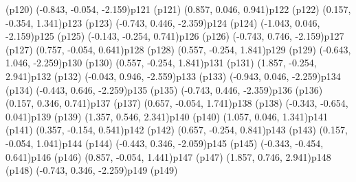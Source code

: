 \psdot[fillcolor=white](p120)
\psPoint(-0.843, -0.054, -2.159){p121}
\psdot[fillcolor=gray](p121)
\psPoint(0.857, 0.046, 0.941){p122}
\psdot[fillcolor=gray](p122)
\psPoint(0.157, -0.354, 1.341){p123}
\psdot[fillcolor=white](p123)
\psPoint(-0.743, 0.446, -2.359){p124}
\psdot[fillcolor=gray](p124)
\psPoint(-1.043, 0.046, -2.159){p125}
\psdot[fillcolor=gray](p125)
\psPoint(-0.143, -0.254, 0.741){p126}
\psdot[fillcolor=white](p126)
\psPoint(-0.743, 0.746, -2.159){p127}
\psdot[fillcolor=white](p127)
\psPoint(0.757, -0.054, 0.641){p128}
\psdot[fillcolor=gray](p128)
\psPoint(0.557, -0.254, 1.841){p129}
\psdot[fillcolor=white](p129)
\psPoint(-0.643, 1.046, -2.259){p130}
\psdot[fillcolor=white](p130)
\psPoint(0.557, -0.254, 1.841){p131}
\psdot[fillcolor=white](p131)
\psPoint(1.857, -0.254, 2.941){p132}
\psdot[fillcolor=gray](p132)
\psPoint(-0.043, 0.946, -2.559){p133}
\psdot[fillcolor=gray](p133)
\psPoint(-0.943, 0.046, -2.259){p134}
\psdot[fillcolor=gray](p134)
\psPoint(-0.443, 0.646, -2.259){p135}
\psdot[fillcolor=gray](p135)
\psPoint(-0.743, 0.446, -2.359){p136}
\psdot[fillcolor=gray](p136)
\psPoint(0.157, 0.346, 0.741){p137}
\psdot[fillcolor=white](p137)
\psPoint(0.657, -0.054, 1.741){p138}
\psdot[fillcolor=white](p138)
\psPoint(-0.343, -0.654, 0.041){p139}
\psdot[fillcolor=gray](p139)
\psPoint(1.357, 0.546, 2.341){p140}
\psdot[fillcolor=white](p140)
\psPoint(1.057, 0.046, 1.341){p141}
\psdot[fillcolor=gray](p141)
\psPoint(0.357, -0.154, 0.541){p142}
\psdot[fillcolor=gray](p142)
\psPoint(0.657, -0.254, 0.841){p143}
\psdot[fillcolor=gray](p143)
\psPoint(0.157, -0.054, 1.041){p144}
\psdot[fillcolor=white](p144)
\psPoint(-0.443, 0.346, -2.059){p145}
\psdot[fillcolor=gray](p145)
\psPoint(-0.343, -0.454, 0.641){p146}
\psdot[fillcolor=white](p146)
\psPoint(0.857, -0.054, 1.441){p147}
\psdot[fillcolor=gray](p147)
\psPoint(1.857, 0.746, 2.941){p148}
\psdot[fillcolor=white](p148)
\psPoint(-0.743, 0.346, -2.259){p149}
\psdot[fillcolor=gray](p149)
